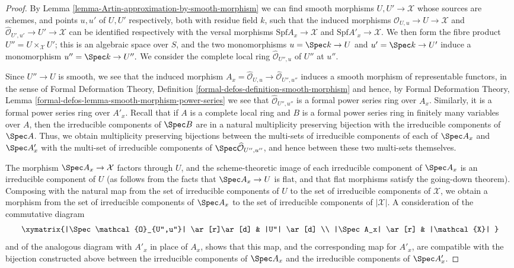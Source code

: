 \begin{proof}
By Lemma \ref{lemma-Artin-approximation-by-smooth-morphism} we can find
smooth morphisms $U,U' \to \mathcal{X}$ whose sources are schemes, and  points
$u,u'$ of $U,U'$ respectively, both with
residue field $k$, such that the induced morphisms $\widehat{\mathcal{O}}_{U,u}
\to U \to \mathcal{X}$ and $\widehat{\mathcal{O}}_{U',u'}
\to U' \to \mathcal{X}$ can be identified respectively with the versal
morphisms $\text{Spf} A_x\to\mathcal{X}$ and $\text{Spf} A'_x \to \mathcal{X}$.
We then form the fibre product $U'' = U \times_{\mathcal{X}} U'$; this is an
algebraic space over $S$, and the two monomorphisms $u = \Spec k \to U$
and $u' = \Spec k \to U'$ induce a monomorphism $u'' = \Spec k \to U''.$
We consider the complete local ring $\widehat{\mathcal{O}}_{U'',u}$
of $U''$ at $u''$.

\medskip\noindent
Since $U'' \to U$ is smooth, we see that the induced morphism
$A_x = \widehat{\mathcal{O}}_{U,u} \to \widehat{\mathcal{O}}_{U'',u''}$ induces
a  smooth morphism of representable functors,
in the sense of
Formal Deformation Theory, Definition
\ref{formal-defos-definition-smooth-morphism}
and hence, by
Formal Deformation Theory, Lemma
\ref{formal-defos-lemma-smooth-morphism-power-series}
we see that $\widehat{\mathcal{O}}_{U'',u''}$ is a formal power series
ring over $A_x$.  Similarly, it is a formal power series
ring over $A'_x$.  Recall that if
$A$ is a complete local ring and $B$ is a formal
power series ring in finitely many variables over $A$,
then the irreducible components of $\Spec B$ are in a natural multiplicity
preserving bijection with the irreducible components of $\Spec A$.
Thus, we obtain multiplicity preserving bijections
between the multi-sets of irreducible components of each
of $\Spec A_x$ and $\Spec A'_x$ with the multi-set
of irreducible components of $\Spec \widehat{\mathcal{O}}_{U'',u''}$,
and hence between these two multi-sets themselves.

\medskip\noindent
The morphism $\Spec A_x \to \mathcal{X}$ factors through $U$,
and the scheme-theoretic image of each irreducible component
of $\Spec A_x$ is an irreducible component of $U$ (as follows
from the facts that $\Spec A_x \to U$ is flat,
and that flat morphisms satisfy the going-down theorem).
Composing with the natural map
from the set of irreducible components of $U$ to the set
of irreducible components of $\mathcal{X}$,
we obtain a morphism from the set of irreducible components of $\Spec A_x$
to the set of irreducible components of $|\mathcal{X}|$.
A consideration of the commutative diagram
$$
\xymatrix{|\Spec \mathcal{O}_{U'',u''}| \ar[r]\ar[d] & |U''| \ar[d] \\
|\Spec A_x| \ar[r] & |\mathcal{X}| }
$$
and of the analogous diagram with $A'_x$ in place of $A_x$,
shows that this map, and the corresponding map for $A'_x$,
are compatible with the bijection constructed
above between the irreducible components of $\Spec A_x$ and
the irreducible components of $\Spec A'_x$.


\end{proof}

